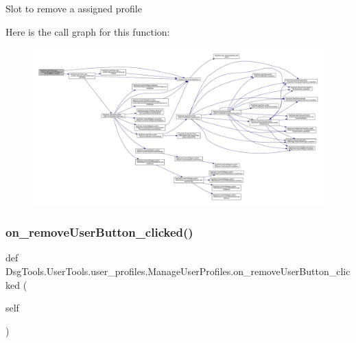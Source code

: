 \begin{DoxyVerb}Slot to remove a assigned profile
\end{DoxyVerb}
 Here is the call graph for this function\+:
\nopagebreak
\begin{figure}[H]
\begin{center}
\leavevmode
\includegraphics[width=350pt]{class_dsg_tools_1_1_user_tools_1_1user__profiles_1_1_manage_user_profiles_abb1da9322b288055c8d5291856536123_cgraph}
\end{center}
\end{figure}
\mbox{\label{class_dsg_tools_1_1_user_tools_1_1user__profiles_1_1_manage_user_profiles_a77ef40627addf8820512fc30a2d01ae2}} 
\subsubsection{\texorpdfstring{on\+\_\+remove\+User\+Button\+\_\+clicked()}{on\_removeUserButton\_clicked()}}
{\footnotesize\ttfamily def Dsg\+Tools.\+User\+Tools.\+user\+\_\+profiles.\+Manage\+User\+Profiles.\+on\+\_\+remove\+User\+Button\+\_\+clicked (\begin{DoxyParamCaption}\item[{}]{self }\end{DoxyParamCaption})}

